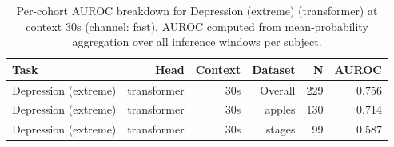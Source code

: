 \begin{table}[ht]
\centering
\caption{Per-cohort AUROC breakdown for Depression (extreme) (transformer) at context 30s (channel: fast). AUROC computed from mean-probability aggregation over all inference windows per subject.}
\label{tab:cohort_depression_extreme_binary_transformer_fast}
\begin{tabular}{lrrrrr}
\toprule
Task & Head & Context & Dataset & N & AUROC \\
\midrule
Depression (extreme) & transformer & 30s & Overall & 229 & 0.756 \\
Depression (extreme) & transformer & 30s & apples & 130 & 0.714 \\
Depression (extreme) & transformer & 30s & stages & 99 & 0.587 \\
\bottomrule
\end{tabular}
\end{table}
